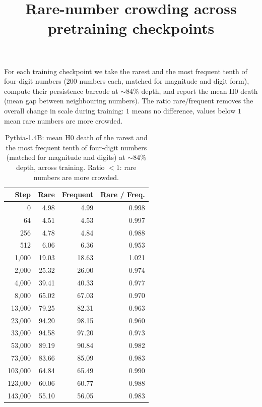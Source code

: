 \documentclass[11pt]{article}
\title{Rare-number crowding across pretraining checkpoints}
\author{}
\date{}
\begin{document}
\maketitle

\noindent For each training checkpoint we take the rarest and the most frequent tenth of four-digit numbers
(200 numbers each, matched for magnitude and digit form), compute their persistence barcode at $\sim$84\% depth,
and report the mean H0 death (mean gap between neighbouring numbers). The ratio rare/frequent removes the overall
change in scale during training: $1$ means no difference, values below $1$ mean rare numbers are more crowded.

\begin{table}[ht]
\centering
\small
\begin{tabular}{rrrr}
\toprule
Step & Rare & Frequent & Rare / Freq. \\
\midrule
0 & 4.98 & 4.99 & 0.998 \\
64 & 4.51 & 4.53 & 0.997 \\
256 & 4.78 & 4.84 & 0.988 \\
512 & 6.06 & 6.36 & 0.953 \\
1{,}000 & 19.03 & 18.63 & 1.021 \\
2{,}000 & 25.32 & 26.00 & 0.974 \\
4{,}000 & 39.41 & 40.33 & 0.977 \\
8{,}000 & 65.02 & 67.03 & 0.970 \\
13{,}000 & 79.25 & 82.31 & 0.963 \\
23{,}000 & 94.20 & 98.15 & 0.960 \\
33{,}000 & 94.58 & 97.20 & 0.973 \\
53{,}000 & 89.19 & 90.84 & 0.982 \\
73{,}000 & 83.66 & 85.09 & 0.983 \\
103{,}000 & 64.84 & 65.49 & 0.990 \\
123{,}000 & 60.06 & 60.77 & 0.988 \\
143{,}000 & 55.10 & 56.05 & 0.983 \\
\bottomrule
\end{tabular}
\caption{Pythia-1.4B: mean H0 death of the rarest and the most frequent tenth of four-digit numbers
(matched for magnitude and digits) at $\sim$84\% depth, across training. Ratio $<1$: rare numbers are more crowded.}
\label{tab:ckpt_pythia}
\end{table}
\end{document}
